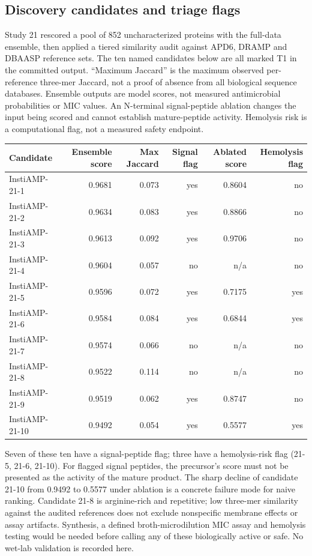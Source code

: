 \subsection{Discovery candidates and triage flags}
Study 21 rescored a pool of 852 uncharacterized proteins with the full-data ensemble, then applied a tiered similarity audit against APD6, DRAMP and DBAASP reference sets. The ten named candidates below are all marked T1 in the committed output. ``Maximum Jaccard'' is the maximum observed per-reference three-mer Jaccard, not a proof of absence from all biological sequence databases. Ensemble outputs are model scores, not measured antimicrobial probabilities or MIC values. An N-terminal signal-peptide ablation changes the input being scored and cannot establish mature-peptide activity. Hemolysis risk is a computational flag, not a measured safety endpoint.
\begin{center}\small\begin{tabular}{lrrrrr}\hline
Candidate & Ensemble score & Max Jaccard & Signal flag & Ablated score & Hemolysis flag\\\hline
InstiAMP-21-1 & 0.9681 & 0.073 & yes & 0.8604 & no \\
InstiAMP-21-2 & 0.9634 & 0.083 & yes & 0.8866 & no \\
InstiAMP-21-3 & 0.9613 & 0.092 & yes & 0.9706 & no \\
InstiAMP-21-4 & 0.9604 & 0.057 & no & n/a & no \\
InstiAMP-21-5 & 0.9596 & 0.072 & yes & 0.7175 & yes \\
InstiAMP-21-6 & 0.9584 & 0.084 & yes & 0.6844 & yes \\
InstiAMP-21-7 & 0.9574 & 0.066 & no & n/a & no \\
InstiAMP-21-8 & 0.9522 & 0.114 & no & n/a & no \\
InstiAMP-21-9 & 0.9519 & 0.062 & yes & 0.8747 & no \\
InstiAMP-21-10 & 0.9492 & 0.054 & yes & 0.5577 & yes \\
\hline\end{tabular}\end{center}
Seven of these ten have a signal-peptide flag; three have a hemolysis-risk flag (21-5, 21-6, 21-10). For flagged signal peptides, the precursor's score must not be presented as the activity of the mature product. The sharp decline of candidate 21-10 from 0.9492 to 0.5577 under ablation is a concrete failure mode for naive ranking. Candidate 21-8 is arginine-rich and repetitive; low three-mer similarity against the audited references does not exclude nonspecific membrane effects or assay artifacts. Synthesis, a defined broth-microdilution MIC assay and hemolysis testing would be needed before calling any of these biologically active or safe. No wet-lab validation is recorded here.
